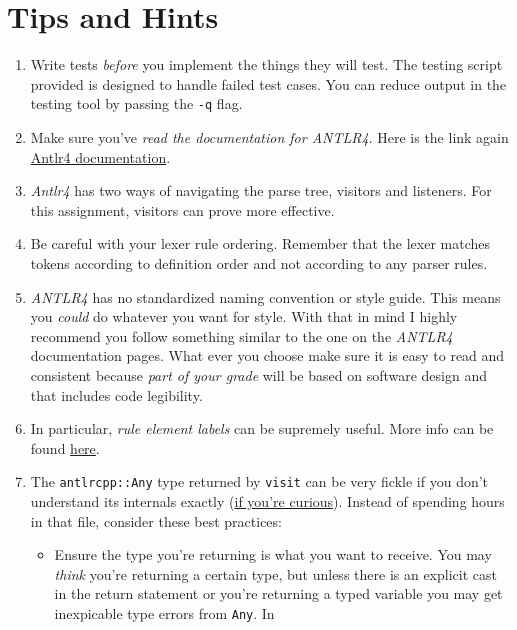 \documentclass{article}
\newcommand{\code}[1]{\texttt{\textmd{#1}}}
\begin{document}
\section{Tips and Hints}
\begin{enumerate}
  \item
    Write tests \textit{before} you implement the things they will test. The testing script
    provided is designed to handle failed test cases. You can reduce output in the testing tool by
    passing the \code{-q} flag.
  \item
    Make sure you've \textit{read the documentation for ANTLR4}. Here is the link again
    \href{https://github.com/antlr/antlr4/blob/master/doc/index.md} {Antlr4 documentation}.
  \item
    \textit{Antlr4} has two ways of navigating the parse tree, visitors and listeners. For this
    assignment, visitors can prove more effective.
  \item
    Be careful with your lexer rule ordering. Remember that the lexer matches tokens according to
    definition order and not according to any parser rules.
  \item
    \textit{ANTLR4} has no standardized naming convention or style guide. This means you
    \textit{could} do whatever you want for style. With that in mind I highly recommend you follow
    something similar to the one on the \textit{ANTLR4} documentation pages. What ever you choose
    make sure it is easy to read and consistent because \textit{part of your grade} will be based
    on software design and that includes code legibility.
  \item
    In particular, \textit{rule element labels} can be supremely useful. More info can be found
    \href{https://github.com/antlr/antlr4/blob/master/doc/parser-rules.md\#alternative-labels}
    {here}.
  \item
    The \code{antlrcpp::Any} type  returned by \code{visit} can be very fickle if you don't
    understand its internals exactly
    (\href{https://github.com/antlr/antlr4/blob/master/runtime/Cpp/runtime/src/support/Any.h} {if
    you're curious}). Instead of spending hours in that file, consider these best practices:
    \begin{itemize}
      \item
        Ensure the type you're returning is what you want to receive. You may \textit{think} you're
        returning a certain type, but unless there is an explicit cast in the return statement or
        you're returning a typed variable you may get inexpicable type errors from \code{Any}. In

\end{itemize}
\end{enumerate}
\end{document}
